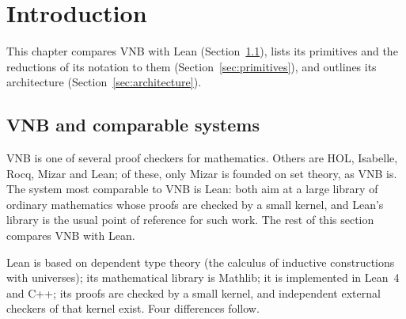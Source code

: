\chapter{Introduction}
\label{ch:intro}

This chapter compares VNB with Lean (Section~\ref{sec:vnb-lean}), lists its
primitives and the reductions of its notation to them
(Section~\ref{sec:primitives}), and outlines its architecture
(Section~\ref{sec:architecture}).

\section{VNB and comparable systems}
\label{sec:vnb-lean}

VNB is one of several proof checkers for mathematics.  Others are
HOL, Isabelle, Rocq, Mizar and Lean; of these, only Mizar is founded on
set theory, as VNB is.  The system most comparable to
VNB is Lean: both aim at a large library of ordinary mathematics whose
proofs are checked by a small kernel, and Lean's library is the usual
point of reference for such work.  The rest of this section compares VNB
with Lean.

Lean is based on dependent type theory (the calculus of inductive
constructions with universes); its mathematical library is Mathlib; it is
implemented in Lean~4 and C++; its proofs are checked by a small kernel,
and independent external checkers of that kernel exist.  Four differences
follow.

